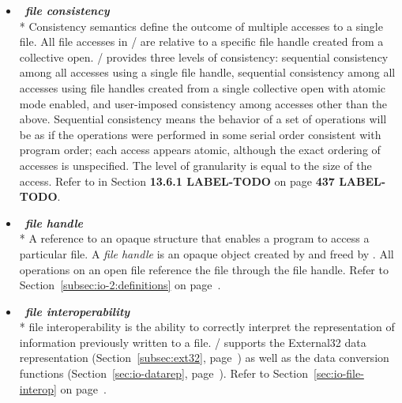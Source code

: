 \begin{itemize}
\label{glossary:file_consistency}
\item  ~\hypertarget{glossary:file_consistency}{\emph{\textbf{file consistency}}} \\*
Consistency semantics define the outcome of multiple accesses
to a single file.
All file accesses in \MPI/ are relative to a specific file handle
created from a collective open.
\MPI/ provides three levels of consistency:
sequential consistency among all accesses using a single file handle,
sequential consistency among all accesses
using file handles created from a single collective open
with atomic mode enabled,
and
user-imposed consistency among accesses other than the above.
Sequential consistency means the behavior of a set of operations
will be as if the operations were performed in some serial order
consistent with program order; each access appears atomic,
although the exact ordering of accesses is unspecified.
The level of granularity is equal to the size of the access.
Refer to  in Section {\bf 13.6.1 LABEL-TODO} on page {\bf 437 LABEL-TODO}.

\label{glossary:file_handle}
\item  ~\hypertarget{glossary:file_handle}{\emph{\textbf{file handle}}} \\*
A reference to an opaque structure that enables a program to access a particular file.
A {\it file handle} is an opaque object created by 
and freed by .
All operations on an open file
reference the file through the file handle.
Refer to Section~\ref{subsec:io-2:definitions} on page~\pageref{subsec:io-2:definitions}.

\label{glossary:file_interoperability}
\item  ~\hypertarget{glossary:file_interoperability}{\emph{\textbf{file interoperability}}} \\*
file interoperability is the ability to
correctly interpret the representation of
 information previously written to a file.
\MPI/ supports the External32 data representation (Section~\ref{subsec:ext32}, page~\pageref{subsec:ext32}) as
well as the data conversion functions (Section~\ref{sec:io-datarep},
page~\pageref{sec:io-datarep}). 
Refer to Section~\ref{sec:io-file-interop} on page~\pageref{sec:io-file-interop}.


\end{itemize}
